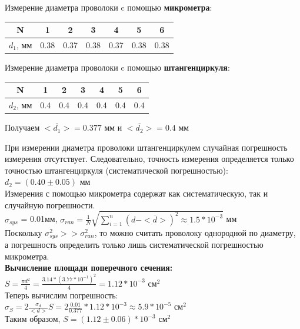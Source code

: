 \documentclass[12pt, a4paper]{article}
\begin{document}
Измерение диаметра проволоки c помощью \textbf{микрометра}:
\begin{center}
    \begin{tabular}{ |c|c|c|c|c|c|c| } \hline
        N & 1 & 2 & 3 & 4 & 5 & 6 \\
        \hline
        $d_1$, мм & 0.38 & 0.37 & 0.38 & 0.37 & 0.38 & 0.38 \\
        \hline
    \end{tabular}
    \end{center} 

    Измерение диаметра проволоки c помощью \textbf{штангенциркуля}:
\begin{center}
    \begin{tabular}{ |c|c|c|c|c|c|c| } \hline
        N & 1 & 2 & 3 & 4 & 5 & 6 \\
        \hline
        $d_2$, мм & 0.4 & 0.4 & 0.4 & 0.4 & 0.4 & 0.4 \\
        \hline
    \end{tabular}
    \end{center} 

    Получаем $<\overline{d_1}> = 0.377$ мм и $<\overline{d_2}> = 0.4$ мм

    При измерении диаметра проволоки штангенциркулем случайная погрешность измерения отсутствует. Следовательно, точность измерения определяется только точностью штангенциркуля (систематической погрешностью): $d_2 = (0.40 \pm 0.05)$ мм \\
    Измерения с помощью микрометра содержат как систематическую, так и случайную погрешности. \\
    $\sigma_{sys}$ = 0.01мм, $\sigma_{ran} = \frac{1}{N} \sqrt{\sum_{i = 1}^{n} (d - <\overline{d}>)^2 \approx 1.5 * 10^{-3}}$ мм \\
    Поскольку $\sigma_{sys}^2 >> \sigma_{ran}^2$, то можно считать проволоку однородной по диаметру, а погрешность определить только лишь систематической погрешностью микрометра. \\
    
    \textbf{Вычисление площади поперечного сечения:} \\
    $S = \frac{\pi d^2}{4} = \frac{3.14 * (3.77 * 10^{-1})^2}{4} = 1.12 * 10^{-3}$ см$^2$ \\
    Теперь вычислим погрешность: \\
    $\sigma_S = 2 \frac{\sigma_d}{<d>}S = 2 \frac{0.01}{0.377} * 1.12 * 10^{-3} \approx 5.9 * 10^{-5}$ см$^2$ \\
    Таким образом, $S = (1.12 \pm 0.06) * 10^{-3}$ см$^2$ \\
    
\end{document}

